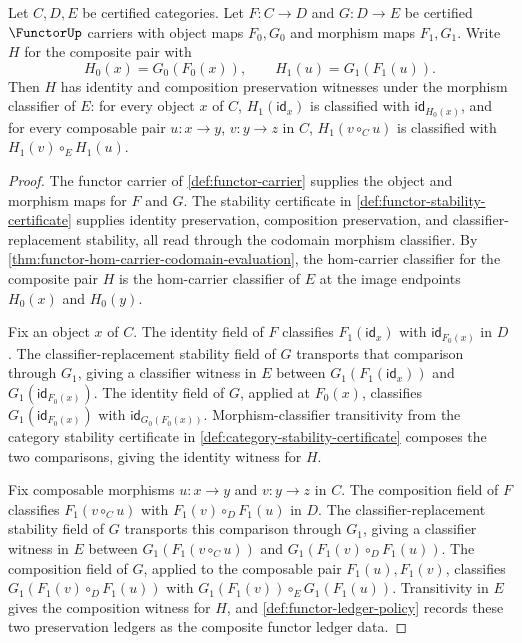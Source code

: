 \begin{theorem}
\label{thm:functor-composite-preservation-witnesses}
Let \(C,D,E\) be certified categories. Let \(F:C\to D\) and \(G:D\to E\) be certified \(\FunctorUp\) carriers with object maps \(F_0,G_0\) and morphism maps \(F_1,G_1\). Write \(H\) for the composite pair with
$$
H_0(x)=G_0(F_0(x)),
\qquad
H_1(u)=G_1(F_1(u)).
$$
Then \(H\) has identity and composition preservation witnesses under the morphism classifier of \(E\): for every object \(x\) of \(C\), \(H_1(\mathsf{id}_x)\) is classified with \(\mathsf{id}_{H_0(x)}\), and for every composable pair \(u:x\to y\), \(v:y\to z\) in \(C\), \(H_1(v\circ_C u)\) is classified with \(H_1(v)\circ_E H_1(u)\).
\end{theorem}
\begin{proof}
The functor carrier of \autoref{def:functor-carrier} supplies the object and morphism maps for \(F\) and \(G\). The stability certificate in \autoref{def:functor-stability-certificate} supplies identity preservation, composition preservation, and classifier-replacement stability, all read through the codomain morphism classifier. By \autoref{thm:functor-hom-carrier-codomain-evaluation}, the hom-carrier classifier for the composite pair \(H\) is the hom-carrier classifier of \(E\) at the image endpoints \(H_0(x)\) and \(H_0(y)\).

Fix an object \(x\) of \(C\). The identity field of \(F\) classifies \(F_1(\mathsf{id}_x)\) with \(\mathsf{id}_{F_0(x)}\) in \(D\). The classifier-replacement stability field of \(G\) transports that comparison through \(G_1\), giving a classifier witness in \(E\) between \(G_1(F_1(\mathsf{id}_x))\) and \(G_1(\mathsf{id}_{F_0(x)})\). The identity field of \(G\), applied at \(F_0(x)\), classifies \(G_1(\mathsf{id}_{F_0(x)})\) with \(\mathsf{id}_{G_0(F_0(x))}\). Morphism-classifier transitivity from the category stability certificate in \autoref{def:category-stability-certificate} composes the two comparisons, giving the identity witness for \(H\).

Fix composable morphisms \(u:x\to y\) and \(v:y\to z\) in \(C\). The composition field of \(F\) classifies \(F_1(v\circ_C u)\) with \(F_1(v)\circ_D F_1(u)\) in \(D\). The classifier-replacement stability field of \(G\) transports this comparison through \(G_1\), giving a classifier witness in \(E\) between \(G_1(F_1(v\circ_C u))\) and \(G_1(F_1(v)\circ_D F_1(u))\). The composition field of \(G\), applied to the composable pair \(F_1(u),F_1(v)\), classifies \(G_1(F_1(v)\circ_D F_1(u))\) with \(G_1(F_1(v))\circ_E G_1(F_1(u))\). Transitivity in \(E\) gives the composition witness for \(H\), and \autoref{def:functor-ledger-policy} records these two preservation ledgers as the composite functor ledger data.
\end{proof}

